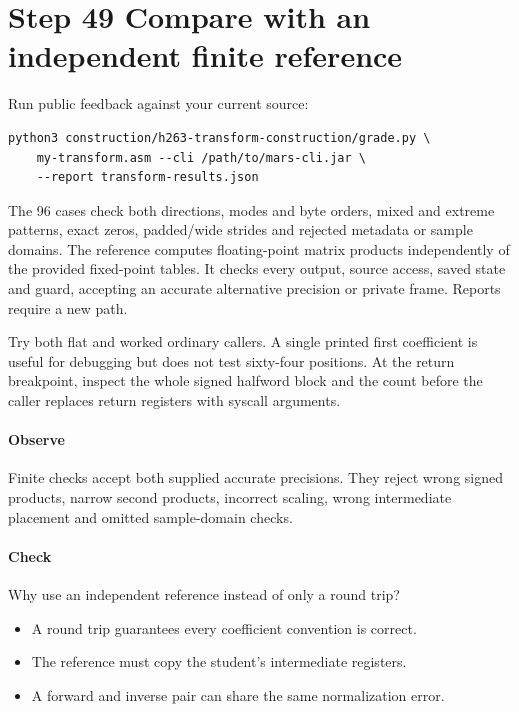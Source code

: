 \section{Step 49 Compare with an independent finite reference}\label{h263-transform-s09}
Run public feedback against your current source:
\begin{verbatim}
python3 construction/h263-transform-construction/grade.py \
    my-transform.asm --cli /path/to/mars-cli.jar \
    --report transform-results.json
\end{verbatim}
The 96 cases check both directions, modes and byte orders, mixed and extreme
patterns, exact zeros, padded/wide strides and rejected metadata or sample domains.
The reference computes floating-point matrix products independently of the
provided fixed-point tables. It checks every output, source access, saved state
and guard, accepting an accurate alternative precision or private frame.
Reports require a new path.

Try both flat and worked ordinary callers. A single printed first coefficient
is useful for debugging but does not test sixty-four positions. At the return
breakpoint, inspect the whole signed halfword block and the count before the
caller replaces return registers with syscall arguments.

\paragraph{Observe} Finite checks accept both supplied accurate precisions.
They reject wrong signed products, narrow second products, incorrect scaling,
wrong intermediate placement and omitted sample-domain checks.
\Needspace{8\baselineskip}
\paragraph{Check} Why use an independent reference instead of only a round trip?
\begin{itemize}
  \item[A.] A round trip guarantees every coefficient convention is correct.
  \item[B.] The reference must copy the student's intermediate registers.
  \item[C.] A forward and inverse pair can share the same normalization error.
\end{itemize}
